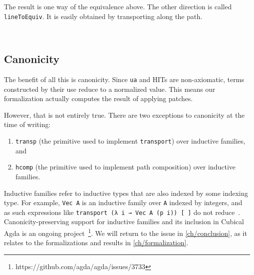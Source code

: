 The result is one way of the equivalence above.
The other direction is called \texttt{lineToEquiv}. It is easily obtained by transporting along the path.
\begin{code}%
%
\>[2]%
\>[14]\AgdaSymbol{:}\AgdaSpace{}%
\AgdaSymbol{\{}\AgdaSpace{}%
\AgdaSpace{}%
\AgdaSymbol{:}\AgdaSpace{}%
\AgdaSymbol{\}}\AgdaSpace{}%
\AgdaSpace{}%
\AgdaSpace{}%
\AgdaSpace{}%
\AgdaSpace{}%
\AgdaSpace{}%
\AgdaSpace{}%
\AgdaSpace{}%
\<%
\\
%
\>[2]\AgdaSpace{}%
\AgdaSymbol{:}\AgdaSpace{}%
\AgdaSymbol{\{}\AgdaSpace{}%
\AgdaSpace{}%
\AgdaSymbol{:}\AgdaSpace{}%
\AgdaSymbol{\}}\AgdaSpace{}%
\AgdaSpace{}%
\AgdaSpace{}%
\AgdaSpace{}%
\AgdaSpace{}%
\AgdaSpace{}%
\AgdaSpace{}%
\AgdaSpace{}%
\<%
\end{code}

\subsection{Canonicity}
The benefit of all this is canonicity. Since \texttt{ua} and HITs are non-axiomatic,
terms constructed by their use reduce to a normalized value. This means our
formalization actually computes the result of applying patches.

However, that is not entirely true.
There are two exceptions to canonicity at the time of writing:
\begin{enumerate}
  \item \texttt{transp} (the primitive used to implement \texttt{transport}) over
  inductive families, and
  \item \texttt{hcomp} (the primitive used to implement path composition) over inductive families.
\end{enumerate}

Inductive families refer to inductive types that are also indexed by some indexing type.
For example, \texttt{Vec A} is an inductive family over \texttt{A} indexed by integers,
and as such expressions like \texttt{transport (λ i → Vec A (p i)) [~]} do not reduce~\cite{vezzosi2021cubical}.
Canonicity-preserving support for inductive families and its inclusion in Cubical Agda is
an ongoing project~\footnote{https://github.com/agda/agda/issues/3733}. We will return
to the issue in \autoref{ch/conclusion}, as it relates to the formalizations and results
in \autoref{ch/formalization}.
